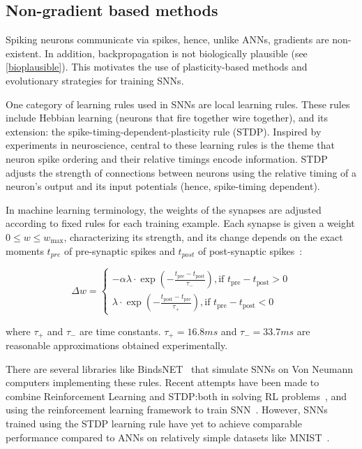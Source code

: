 \documentclass[fyp]{socreport}
\begin{document}
\subsection{Non-gradient based methods}

Spiking neurons communicate via spikes, hence, unlike ANNs, gradients are
non-existent. In addition, backpropagation is not biologically plausible (see
\autoref{bioplausible}). This motivates the use of plasticity-based methods and
evolutionary strategies for training SNNs.

One category of learning rules used in SNNs are local learning rules.  These
rules include Hebbian learning (neurons that fire together wire together), and
its extension: the spike-timing-dependent-plasticity rule (STDP). Inspired by
experiments in neuroscience, central to these learning rules is the theme that
neuron spike ordering and their relative timings encode information. STDP
adjusts the strength of connections between neurons using the relative timing of
a neuron's output and its input potentials (hence, spike-timing dependent).

In machine learning terminology, the weights of the synapses are adjusted
according to fixed rules for each training example. Each synapse is given a
weight \(0 \le w \le w_{\max}\), characterizing its strength, and its change
depends on the exact moments \(t_{pre}\) of pre-synaptic spikes and \(t_{post}\)
of post-synaptic spikes~\cite{sboev18_spikin_neural_networ_reinf_learn}:

\begin{equation}
  \Delta w=\left\{\begin{array}{l}{
                    -\alpha \lambda \cdot \exp \left(-\frac{t_{\mathrm{pre}}-t_{\mathrm{post}}}{\tau_{-}}\right),
                    \text {if } t_{\mathrm{pre}}-t_{\mathrm{post}}>0} \\
                    {\lambda \cdot \exp \left(-\frac{t_{\mathrm{post}}-t_{\mathrm{pre}}}{\tau_{+}}\right),
                    \text {if } t_{\mathrm{pre}}-t_{\mathrm{post}}<0}
                  \end{array}\right.
\end{equation}

where \(\tau_{+}\) and \(\tau_{-}\) are time constants. \(\tau_{+} = 16.8ms\)
and \(\tau_{-} = 33.7ms\) are reasonable approximations obtained experimentally.

There are several libraries like BindsNET~\cite{10.3389/fninf.2018.00089} that
simulate SNNs on Von Neumann computers implementing these rules. Recent attempts
have been made to combine Reinforcement Learning and STDP:\@ both in solving RL
problems~\cite{10.3389/fninf.2018.00089}, and using the reinforcement learning
framework to train SNN~\cite{10.3389/fnbot.2019.00018,10.3389/fnins.2018.00435}.
However, SNNs trained using the STDP learning rule have yet to achieve
comparable performance compared to ANNs on relatively simple datasets like
MNIST~\cite{TAVANAEI201947}.
\end{document}

